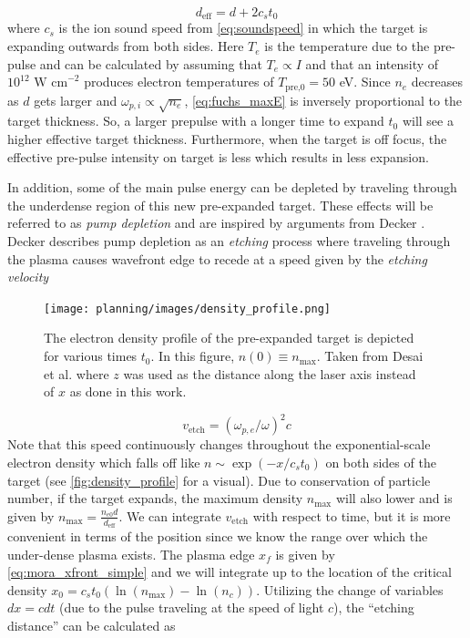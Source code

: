 \begin{equation}
	d_\text{eff} = d + 2 c_s t_0 \label{eq:d_eff}
\end{equation}
where $c_s$ is the ion sound speed from \cref{eq:soundspeed} in which the target is expanding outwards from both sides. Here $T_e$ is the temperature due to the pre-pulse and can be calculated by assuming that $T_e \propto I$ and that an intensity of $10^{12} \text{ W cm}^{-2}$ produces electron temperatures of $T_\text{pre,0} = 50$ eV. Since $n_e$ decreases as $d$ gets larger and $\omega_{p,i} \propto \sqrt{n_e}$, \autoref{eq:fuchs_maxE} is inversely proportional to the target thickness. So, a larger prepulse with a longer time to expand $t_0$ will see a higher effective target thickness. Furthermore, when the target is off focus, the effective pre-pulse intensity on target is less which results in less expansion.

In addition, some of the main pulse energy can be depleted by traveling through the underdense region of this new pre-expanded target. These effects will be referred to as \emph{pump depletion} and are inspired by arguments from Decker \cite{Decker_1996_PoP}. Decker describes pump depletion as an \emph{etching} process where traveling through the plasma causes wavefront edge to recede at a speed given by the \emph{etching velocity} 

\begin{figure}
	\centering 
	\texttt{[image: planning/images/density\_profile.png]}
	\caption{The electron density profile of the pre-expanded target is depicted for various times $t_0$. In this figure, $n(0) \equiv n_\text{max}$. Taken from Desai et al. \cite{Desai_2025_APL} where $z$ was used as the distance along the laser axis instead of $x$ as done in this work. }
	\label{fig:density_profile}
\end{figure}
\begin{equation}
	v_\text{etch} = (\omega_{p,e}/\omega)^2 c \label{eq:vetch}
\end{equation}
Note that this speed continuously changes throughout the exponential-scale electron density which falls off like $n \sim \exp(-x/c_s t_0)$ on both sides of the target (see \autoref{fig:density_profile} for a visual). Due to conservation of particle number, if the target expands, the maximum density $n_\text{max}$ will also lower and is given by $n_\text{max} = \frac{n_{e0} d}{d_\text{eff}}$. We can integrate $v_\text{etch}$ with respect to time, but it is more convenient in terms of the position since we know the range over which the under-dense plasma exists. The plasma edge $x_f$ is given by \autoref{eq:mora_xfront_simple} and we will integrate up to the location of the critical density $x_0 = c_s t_0 (\ln(n_\text{max}) - \ln(n_c))$. Utilizing the change of variables $dx = c dt$ (due to the pulse traveling at the speed of light $c$), the ``etching distance'' can be calculated as \cite{Desai_2025_APL} 

